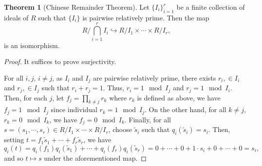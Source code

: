 \documentclass[]{article}
\theoremstyle{definition}
\newtheorem{theorem}{Theorem}
\theoremstyle{definition}
\begin{document}
\begin{theorem}[Chinese Remainder Theorem]
  Let \(\{I_i\}_{i = 1}^r\) be a finite collection of ideals of \(R\) such 
  that \(\{I_i\}\) is pairwise relatively prime. Then the map  
  \[R / \bigcap_{i = 1}^r I_i \hookrightarrow R / I_1 \times \cdots \times R / I_r,\]
  is an isomorphism.
\end{theorem}
\begin{proof}
  It suffices to prove surjectivity. 

  For all \(i, j\), \(i \neq j\), as \(I_i\) and \(I_j\) are pairwise relatively 
  prime, there exists \(r_i, \in I_i\) and \(r_j, \in I_j\) such that 
  \(r_i + r_j = 1\). Thus, \(r_i = 1 \mod I_j\) and \(r_j = 1 \mod I_i\). Then, 
  for each \(j\), let \(f_j = \prod_{k \neq j} r_k\) where \(r_k\) is defined 
  as above, we have \(f_j = 1 \mod I_j\) since individual \(r_k = 1 \mod I_j\). 
  On the other hand, for all \(k \neq j\), \(r_k = 0 \mod I_k\), we have 
  \(f_j = 0 \mod I_k\). Finally, for all 
  \(s = (s_1, \cdots, s_r) \in R / I_1 \times \cdots \times R / I_r\), choose 
  \(\tilde s_i\) such that \(q_i(\tilde s_i) = s_i\). Then, setting 
  \(t = f_1 \tilde s_1 + \cdots + f_r \tilde s_r\), we have 
  \[q_i(t) = q_i(f_1)q_i(\tilde s_1) + \cdots + q_i(f_r)q_i(\tilde s_r) 
    = 0 + \cdots + 0 + 1 \cdot s_i + 0 + \cdots + 0 = s_i,\]
  and so \(t \mapsto s\) under the aforementioned map.
\end{proof}
\end{document}
